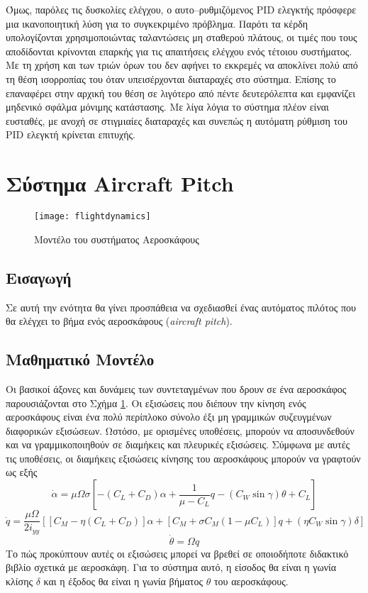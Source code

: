 Όμως, παρόλες τις δυσκολίες ελέγχου, ο αυτο--ρυθμιζόμενος PID ελεγκτής πρόσφερε μια ικανοποιητική λύση για το συγκεκριμένο πρόβλημα. Παρότι τα κέρδη υπολογίζονται χρησιμοποιώντας ταλαντώσεις μη σταθερού πλάτους, οι τιμές που τους αποδίδονται κρίνονται επαρκής για τις απαιτήσεις ελέγχου ενός τέτοιου συστήματος. Με τη χρήση και των τριών όρων του δεν αφήνει το εκκρεμές να αποκλίνει πολύ από τη θέση ισορροπίας του όταν υπεισέρχονται διαταραχές στο σύστημα. Επίσης το επαναφέρει στην αρχική του θέση σε λιγότερο από πέντε δευτερόλεπτα και εμφανίζει μηδενικό σφάλμα μόνιμης κατάστασης. Με λίγα λόγια το σύστημα πλέον είναι ευσταθές, με ανοχή σε στιγμιαίες διαταραχές και συνεπώς η αυτόματη ρύθμιση του PID ελεγκτή κρίνεται επιτυχής.

\section{Σύστημα Aircraft Pitch} \label{sec:aircraft_pitch}

\begin{figure}[h]
  \centering
  \texttt{[image: flightdynamics]}
  \caption{Μοντέλο του συστήματος Αεροσκάφους}
  \label{fig:flightdynamics}
\end{figure}

\subsection{Εισαγωγή}

Σε αυτή την ενότητα θα γίνει προσπάθεια να σχεδιασθεί ένας αυτόματος πιλότος που θα ελέγχει το βήμα ενός αεροσκάφους (\emph{aircraft pitch}).

\subsection{Μαθηματικό Μοντέλο}
Οι βασικοί άξονες και δυνάμεις των συντεταγμένων που δρουν σε ένα αεροσκάφος παρουσιάζονται στο Σχήμα \ref{fig:flightdynamics}. Οι εξισώσεις που διέπουν την κίνηση ενός αεροσκάφους είναι ένα πολύ περίπλοκο σύνολο έξι μη γραμμικών συζευγμένων διαφορικών εξισώσεων. Ωστόσο, με ορισμένες υποθέσεις, μπορούν να αποσυνδεθούν και να γραμμικοποιηθούν σε διαμήκεις και πλευρικές εξισώσεις. Σύμφωνα με αυτές τις υποθέσεις, οι διαμήκεις εξισώσεις κίνησης του αεροσκάφους μπορούν να γραφτούν ως εξής
\begin{equation}
\dot{\alpha}=\mu\Omega\sigma\left[-\left(C_L+C_D\right)\alpha+\frac{1}{\mu-C_L}q-\left(C_W\sin\gamma\right)\theta+C_L\right]
\end{equation}
\begin{equation}
\dot{q}=\frac{\mu\Omega}{2i_{yy}}\left[\left[C_M-\eta\left(C_L+C_D\right)\right]\alpha+\left[C_M+\sigma C_M\left(1-\mu C_L\right)\right]q+\left(\eta C_W\sin\gamma\right)\delta\right]
\end{equation}
\begin{equation}
\dot{\theta}=\Omega q
\end{equation}
Το πώς προκύπτουν αυτές οι εξισώσεις μπορεί να βρεθεί σε οποιοδήποτε διδακτικό βιβλίο σχετικά με αεροσκάφη. Για το σύστημα αυτό, η είσοδος θα είναι η γωνία κλίσης $\delta$ και η έξοδος θα είναι η γωνία βήματος $\theta$ του αεροσκάφους.


